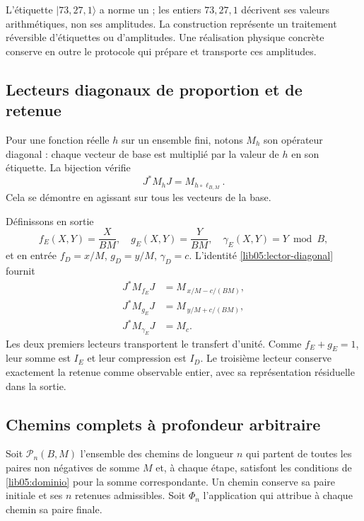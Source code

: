 L’étiquette \(|73,27,1\rangle\) a norme un ; les entiers
\(73,27,1\) décrivent ses valeurs arithmétiques, non ses amplitudes.
La construction représente un traitement réversible d’étiquettes
ou d’amplitudes. Une réalisation physique concrète conserve en outre
le protocole qui prépare et transporte ces amplitudes.

\subsection{Lecteurs diagonaux de proportion et de retenue}
\label{lib05:diagonales}

Pour une fonction réelle \(h\) sur un ensemble fini, notons
\(M_h\) son opérateur diagonal : chaque vecteur de base est multiplié
par la valeur de \(h\) en son étiquette. La bijection vérifie
\begin{equation}
 J^*M_hJ=M_{h\circ\ell_{B,M}}.
 \label{lib05:lector-diagonal}
\end{equation}
Cela se démontre en agissant sur tous les vecteurs de la base.

Définissons en sortie
\begin{equation}
 f_E(X,Y)=\frac{X}{BM},\quad
 g_E(X,Y)=\frac{Y}{BM},\quad
 \gamma_E(X,Y)=Y\bmod B,
 \label{lib05:lectores-salida}
\end{equation}
et en entrée \(f_D=x/M\), \(g_D=y/M\), \(\gamma_D=c\). L'identité \eqref{lib05:lector-diagonal} fournit
\begin{align}
 J^*M_{f_E}J&=M_{\,x/M-c/(BM)},\nonumber\\
 J^*M_{g_E}J&=M_{\,y/M+c/(BM)},\nonumber\\
 J^*M_{\gamma_E}J&=M_c.
 \label{lib05:transporte-fracciones}
\end{align}
Les deux premiers lecteurs transportent le transfert d’unité.
Comme \(f_E+g_E=1\), leur somme est \(I_E\) et leur compression est
\(I_D\). Le troisième lecteur conserve exactement la retenue comme
observable entier, avec sa représentation résiduelle dans la sortie.

\subsection{Chemins complets à profondeur arbitraire}
\label{lib05:rutas}

Soit \(\mathcal P_n(B,M)\) l'ensemble des chemins de longueur \(n\) qui partent de toutes les paires non négatives de somme \(M\) et, à chaque étape, satisfont les conditions de \eqref{lib05:dominio} pour la somme correspondante. Un chemin conserve sa paire initiale et ses \(n\) retenues admissibles. Soit \(\Phi_n\) l'application qui attribue à chaque chemin sa paire finale.

